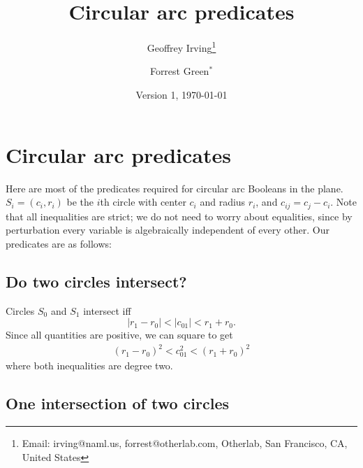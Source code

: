 \documentclass[11pt]{article}
\title{Circular arc predicates}
\author{Geoffrey Irving\thanks{Email: irving@naml.us, forrest@otherlab.com, Otherlab, San Francisco, CA, United States}
\and Forrest Green$^*$}
\date{Version 1, \today}
\begin{document}
\maketitle

\section{Circular arc predicates}

Here are most of the predicates required for circular arc Booleans in the plane.  $S_i = (c_i,r_i)$ be the $i$th
circle with center $c_i$ and radius $r_i$, and $c_{ij} = c_j - c_i$.
Note that all inequalities are strict; we do not need to worry about equalities, since by perturbation every variable is
algebraically independent of every other.  Our predicates are as follows:

\subsection{Do two circles intersect?}

Circles $S_0$ and $S_1$ intersect iff
$$ | r_1 - r_0 | < |c_{01}| < r_1 + r_0. $$
Since all quantities are positive, we can square to get
\begin{align*}
(r_1 - r_0)^2 < c_{01}^2 < (r_1 + r_0)^2
\end{align*}
where both inequalities are degree two.

\subsection{One intersection of two circles}
\end{document}

